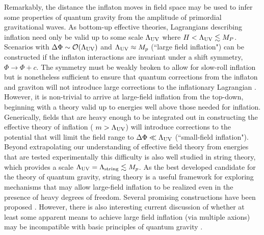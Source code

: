 Remarkably, the distance the inflaton moves in field space may be used to infer some properties of quantum gravity from the amplitude of primordial gravitational waves. As bottom-up effective theories, Lagrangians describing inflation need only be valid up to some scale $\Lambda_{\rm UV}$ where $H<\Lambda_{\rm UV}\lesssim M_P$. Scenarios with $\Delta\Phi\sim\mathcal{O}(\Lambda_{\rm UV})$ and $\Lambda_{\rm UV}\approx M_p$ (``large field inflation") can be constructed if the inflaton interactions are invariant under a shift symmetry, $\Phi\rightarrow\Phi+c$. The symmetry must be weakly broken to allow for slow-roll inflation but is nonetheless sufficient to ensure that quantum corrections from the inflaton and graviton will not introduce large corrections to the inflationary Lagrangian \cite{Linde:2005ht, Kaloper:2011jz, Csaki:2014bua,Kaplan:2015fuy,Choi:2015fiu}. However, it is non-trivial to arrive at large-field inflation from the top-down, beginning with a theory valid up to energies well above those needed for inflation. Generically, fields that are heavy enough to be integrated out in constructing the effective theory of inflation ( $m>\Lambda_{\rm UV}$) will introduce corrections to the potential that will limit the field range to $\Delta\Phi\ll\Lambda_{\rm UV}$ (``small-field inflation"). Beyond extrapolating our understanding of effective field theory from energies that are tested experimentally this difficulty is also well studied in string theory, which provides a scale $\Lambda_{\rm UV}=\Lambda_{\rm string}\lesssim M_p$. As the best developed candidate for the theory of quantum gravity, string theory is a useful framework for exploring mechanisms that may allow large-field inflation to be realized even in the presence of heavy degrees of freedom. Several promising constructions have been proposed \cite{Silverstein:2008sg, McAllister:2008hb, Kaloper:2008fb, Berg:2009tg, Palti:2014kza,McAllister:2014mpa, Marchesano:2014mla, Blumenhagen:2015xpa}. However, there is also interesting current discussion of whether at least some apparent means to achieve large field inflation (via multiple axions) may be incompatible with basic principles of quantum gravity \cite{Kim:2004rp, delaFuente:2014aca,Bachlechner:2015qja,Heidenreich:2015wga,Kooner:2015rza}. 

